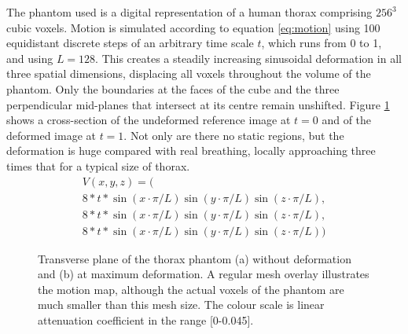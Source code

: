 The phantom used is a digital representation\cite{xcatweb} of a human thorax comprising $256^3$ cubic voxels.  Motion is simulated according to equation \ref{eq:motion} using 100 equidistant discrete steps of an arbitrary time scale $t$, which runs from 0 to 1, and using $L=128$.  This creates a steadily increasing sinusoidal deformation in all three spatial dimensions, displacing all voxels throughout the volume of the phantom.  Only the boundaries at the faces of the cube and the three perpendicular mid-planes that intersect at its centre remain unshifted.  Figure \ref{fig:motion_Res2} shows a cross-section of the undeformed reference image at $t=0$ and of the deformed image at $t=1$.  Not only are there no static regions, but the deformation is huge compared with real breathing\cite{Liu2007531}, locally approaching three times that for a typical size of thorax.
\begin{eqnarray}
V(x,y,z) = \bigl(\nonumber\\
8*t*\sin(x \cdot \pi/L)\sin(y \cdot \pi/L)\sin(z \cdot \pi/L),\nonumber \\
8*t*\sin(x \cdot \pi/L)\sin(y \cdot \pi/L)\sin(z \cdot \pi/L),\nonumber\\
8*t*\sin(x \cdot \pi/L)\sin(y \cdot \pi/L)\sin(z \cdot \pi/L)\bigr)
\label{eq:motion}
\end{eqnarray}



\begin{figure}
\begin{center} 
\caption{\label{fig:motion_Res2} Transverse plane of the thorax phantom (a) without deformation and (b) at maximum deformation.  A regular mesh overlay illustrates the motion map, although the actual voxels of the phantom are much smaller than this mesh size. The colour scale is linear attenuation coefficient in the range [0-0.045].} 
\end{center} 
\end{figure}

